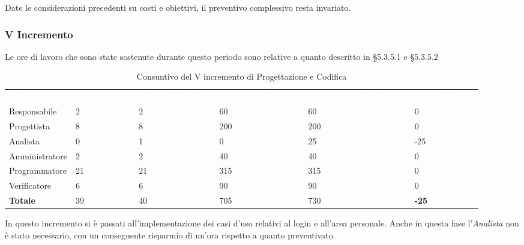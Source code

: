 Date le considerazioni precedenti su costi e obiettivi, il preventivo complessivo resta invariato.


\pagebreak


\subsubsection{V Incremento}
Le ore di lavoro che sono state sostenute durante questo periodo sono relative a quanto descritto in §5.3.5.1 e §5.3.5.2

\begin{table}[H]
\begin{center}
\renewcommand{\arraystretch}{1.5}
\begin{tabular}{ m{}<{\centering}  m{}<{\centering} m{}<{\centering} m{}<{\centering} m{}<{\centering} m{}<{\centering}}
	\rowcolor{darkblue}
	\textcolor{white}{\textbf{Ruolo}} & \textcolor{white}{\textbf{Ore Effettive}} & \textcolor{white}{\textbf{Ore Preventivate}}&\textcolor{white}{\textbf{Costo Effettivo (\euro)}}&\textcolor{white}{\textbf{Costo Preventivato (\euro)}}&\textcolor{white}{\textbf{Differenza (\euro)}}\\ 

	Responsabile  & 2 & 2 & 60 & 60 & 0\\	
	
	Progettista & 8 & 8 & 200 & 200 & 0\\
	
	Analista & 0 & 1 & 0 & 25 & -25\\
	
	Amministratore & 2 & 2 & 40 & 40 & 0\\
	
	Programmatore & 21 & 21 & 315 & 315 & 0\\
	
	Verificatore & 6 & 6 & 90 & 90 & 0\\
	
	\textbf{Totale} & 39 & 40 & 705 & 730 & \textbf{-25} \\
	
\end{tabular}
\caption{Consuntivo del V incremento di Progettazione e Codifica}
\end{center}
\end{table}

In questo incremento si è passati all'implementazione dei casi d'uso relativi al login e all'area personale. Anche in questa fase l'\textit{Analista} non è stato necessario, con un conseguente risparmio di un'ora rispetto a quanto preventivato. 

